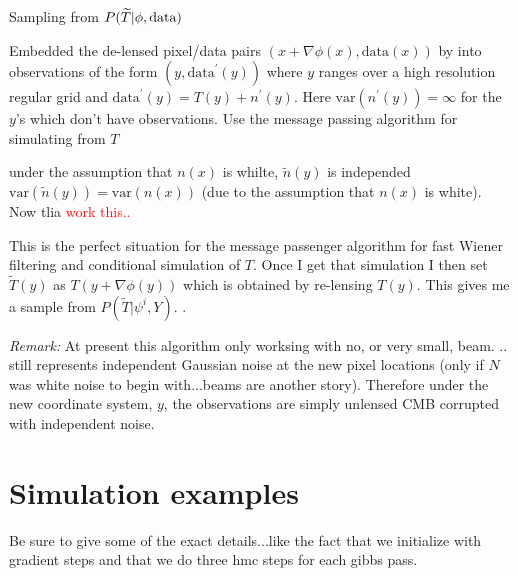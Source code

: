 \documentclass[noinfoline]{imsart}
\begin{document}
\begin{algorithm}[H]
\small
\caption{Sampling from $P(\widetilde T |  \phi,\text{\rm data})$}
\label{ith step of HMC}
\begin{algorithmic}[1]
\State Embedded the de-lensed pixel/data pairs  $(x+\nabla\phi(x), \text{data}(x))$ by into observations of the form $(y, \text{data}^\prime(y))$ where $y$ ranges over a high resolution regular grid and $\text{data}^\prime(y) = T(y) + n^\prime(y)$. Here $\text{var}(n^\prime(y))=\infty$ for the $y$'s which don't have observations.
\State Use the message passing algorithm for simulating from $T$ 
\end{algorithmic}
\end{algorithm}





under the assumption that $n(x)$ is whilte, $\tilde n(y)$ is independed  $\text{var}(\tilde n(y)) = \text{var}(n(x))$ (due to the assumption that $n(x)$ is white). Now tlia
\textcolor{red}{work this..}



This is the perfect situation for the message passenger algorithm for fast Wiener filtering and conditional simulation of $T$. Once I get that simulation I then set $\tilde T(y)$ as $T(y + \nabla \phi(y))$ which is obtained by re-lensing $T(y)$. This gives me a sample from $P(\widetilde T|\psi^{i},Y)$.
.

{\em Remark:} At present this algorithm only worksing with no, or very small, beam. ..
 still represents independent Gaussian noise at the new pixel locations (only if $N$ was white noise to begin with...beams are another story). Therefore under the new coordinate system, $y$, the observations are simply unlensed CMB  corrupted with independent noise.
 






%
%
\section{Simulation examples}
\label{Section: simulation examples}


Be sure to give some of the exact details...like the fact that we initialize with gradient steps and that we do three hmc steps for each gibbs pass.

%
%
\end{document}
